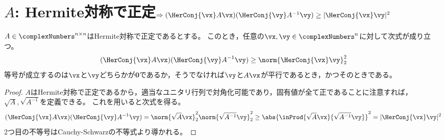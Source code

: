     \section{\texorpdfstring{$A$}{A}: Hermite対称で正定\texorpdfstring{$\Rightarrow (\HerConj{\vx}A\vx)(\HerConj{\vy}A^{-1}\vy) \geq |\HerConj{\vx}\vy|^2$}{⇒ (x\string^*Ax)(y\string^*A\string^(-1)y) ≥ |x\string^*y|\string^2}}
        \begin{shadebox}
            $A \in \complexNumbers^{n\times n}$はHermite対称で正定であるとする。
            このとき，任意の$\vx, \vy \in \complexNumbers^n$に対して次式が成り立つ。
            \[ (\HerConj{\vx}A\vx)(\HerConj{\vy}A^{-1}\vy) \geq \norm{\HerConj{\vx}\vy}_2^2 \]
            等号が成立するのは$\vx$と$\vy$どちらかが$\bm{0}$であるか，そうでなければ$\vy$と$A\vx$が平行であるとき，かつそのときである。
        \end{shadebox}
        \begin{proof}
            $A$はHermite対称で正定であるから，適当なユニタリ行列で対角化可能であり，固有値が全て正であることに注意すれば，$\sqrt{A},\sqrt{A^{-1}}$を定義できる。
            これを用いると次式を得る。
            \[ (\HerConj{\vx}A\vx)(\HerConj{\vy}A^{-1}\vy) = \norm{\sqrt{A}\vx}_2^2 \norm{\sqrt{A^{-1}}\vy}_2^2 \geq \abs{\inProd{\sqrt{A}\vx}{\sqrt{A^{-1}}\vy}}^2 = |\HerConj{\vx}\vy|^2 \]
            2つ目の不等号はCauchy-Schwarzの不等式より導かれる。
        \end{proof}